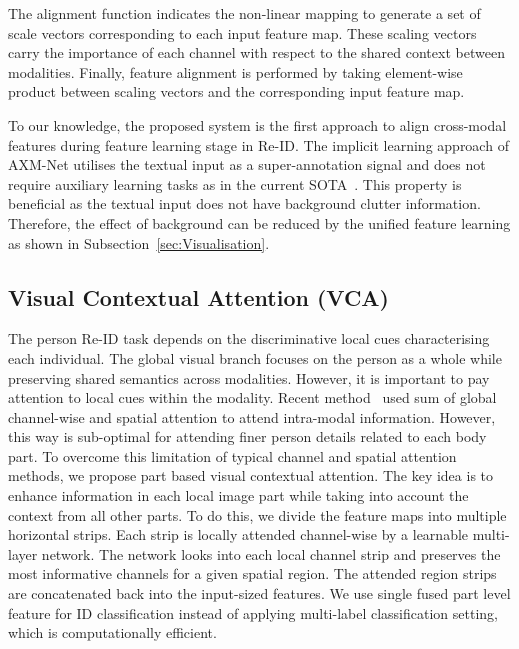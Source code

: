 \documentclass[10pt,twocolumn,letterpaper]{article}
\begin{document}
The alignment function  indicates the non-linear mapping to generate a set of scale vectors  corresponding to each input feature map. These scaling vectors carry the importance of each channel with respect to the shared context between modalities. Finally, feature alignment is performed by taking element-wise product between scaling vectors and the corresponding input feature map.


To our knowledge, the proposed system is the first approach to align cross-modal features during feature learning stage in Re-ID. The implicit learning approach of AXM-Net utilises the textual input as a super-annotation signal and does not require auxiliary learning tasks as in the current SOTA~\cite{aggarwal2020text,wang2020vitaa}. This property is beneficial as the textual input does not have background clutter information. Therefore, the effect of background can be reduced by the unified feature learning as shown in Subsection~\ref{sec:Visualisation}. 

\subsection{Visual Contextual Attention (VCA)}
The person Re-ID task depends on the discriminative local cues characterising each individual. The global visual branch focuses on the person as a whole while preserving shared semantics across modalities. However, it is important to pay attention to local cues within the modality. Recent method~\cite{wang2020img} used sum of global channel-wise and spatial attention to attend intra-modal information. However, this way is sub-optimal for attending finer person details related to each body part. To overcome this limitation of typical channel and spatial attention methods, we propose part based visual contextual attention. The key idea is to enhance information in each local image part while taking into account the context from all other parts. To do this, we divide the feature maps into multiple horizontal strips. Each strip is locally attended channel-wise by a learnable multi-layer network. The network looks into each local channel strip and preserves the most informative channels for a given spatial region. The attended region strips are concatenated back into the input-sized features. We use single fused part level feature  for ID classification instead of applying multi-label classification setting, which is computationally efficient.
\end{document}
